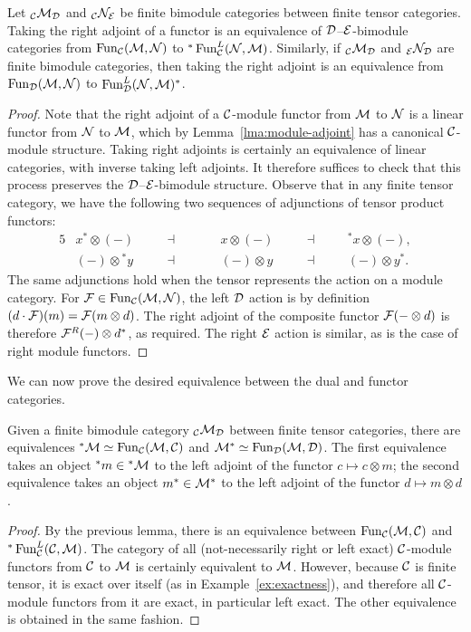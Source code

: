 \documentclass{amsart}
\begin{document}
\begin{lemma}
Let ${}_\mathcal C \mathcal M_\mathcal D$ and ${}_\mathcal C \mathcal N_\mathcal E$ be finite bimodule categories between finite tensor categories.  Taking the right adjoint of a functor is an equivalence of $\mathcal D$--$\mathcal E$-bimodule categories from $\operatorname{Fun}_\mathcal C(\mathcal M,\mathcal N)$ to ${}^* \operatorname{Fun}^L_\mathcal C(\mathcal N,\mathcal M)$.  Similarly, if ${}_\mathcal C \mathcal M_\mathcal D$ and ${}_\mathcal E \mathcal N_\mathcal D$ are finite bimodule categories, then taking the right adjoint is an equivalence from $\operatorname{Fun}_\mathcal D(\mathcal M,\mathcal N)$ to $\operatorname{Fun}^L_\mathcal D(\mathcal N,\mathcal M)^*$.
\end{lemma}
\begin{proof}
Note that the right adjoint of a $\mathcal C$-module functor from $\mathcal M$ to $\mathcal N$ is a linear functor from $\mathcal N$ to $\mathcal M$, which by Lemma~\ref{lma:module-adjoint} has a canonical $\mathcal C$-module structure.  Taking right adjoints is certainly an equivalence of linear categories, with inverse taking left adjoints.  It therefore suffices to check that this process preserves the $\mathcal D$--$\mathcal E$-bimodule structure.  Observe that in any finite tensor category, we have the following two sequences of adjunctions of tensor product functors:
\begin{alignat*}{5}
	& x^* \otimes (-)  \quad & &  \dashv \quad &&  \quad x \otimes (-)  \quad &&  \dashv &&  \quad {}^*x \otimes (-), \\
	& (-) \otimes {}^* y  \quad & &  \dashv \quad &&  \quad (-) \otimes y  \quad &&  \dashv &&  \quad (-) \otimes y^*. 
\end{alignat*}  
The same adjunctions hold when the tensor represents the action on a module category.  For $\mathcal F \in \operatorname{Fun}_{\mathcal C}(\mathcal M,\mathcal N)$, the left $\mathcal D$ action is by definition $(d \cdot \mathcal F)(m) = \mathcal F(m \otimes d)$.  The right adjoint of the composite functor $\mathcal F(- \otimes d)$ is therefore $\mathcal F^R(-) \otimes d^*$, as required.  The right $\mathcal E$ action is similar, as is the case of right module functors.
\end{proof}


We can now prove the desired equivalence between the dual and functor categories.
\begin{proposition} \label{prop:dual-formula-for-adjoints}
Given a finite bimodule category ${}_\mathcal C \mathcal M_\mathcal D$ between finite tensor categories, there are equivalences ${}^* \mathcal M \simeq \operatorname{Fun}_\mathcal C(\mathcal M,\mathcal C)$ and $\mathcal M^* \simeq \operatorname{Fun}_\mathcal D(\mathcal M,\mathcal D)$.  The first equivalence takes an object ${}^* m \in {}^* \mathcal M$ to the left adjoint of the functor $c \mapsto c \otimes m$; the second equivalence takes an object $m^* \in \mathcal M^*$ to the left adjoint of the functor $d \mapsto m \otimes d$.
\end{proposition}
\begin{proof}
By the previous lemma, there is an equivalence between $\operatorname{Fun}_\mathcal C(\mathcal M,\mathcal C)$ and ${}^* \operatorname{Fun}^L_\mathcal C(\mathcal C,\mathcal M)$.  The category of all (not-necessarily right or left exact) $\mathcal C$-module functors from $\mathcal C$ to $\mathcal M$ is certainly equivalent to $\mathcal M$.  However, because $\mathcal C$ is finite tensor, it is exact over itself (as in Example~\ref{ex:exactness}), and therefore all $\mathcal C$-module functors from it are exact, in particular left exact.  The other equivalence is obtained in the same fashion.
\end{proof}
\end{document}
